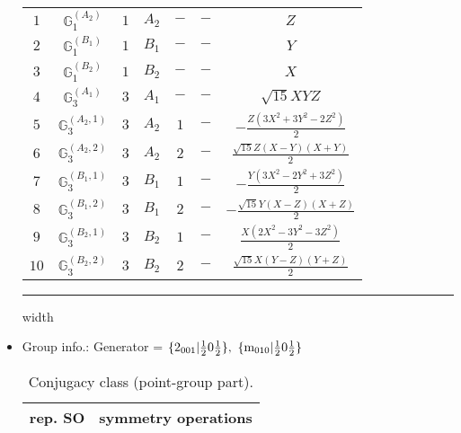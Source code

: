 \documentclass[fleqn,10pt,landscape]{article}
\begin{document}
\begin{itemize}
\begin{center}
\begin{longtable}{ccccccc}
$ 1 $ & $ \mathbb{G}_{1}^{(A_{2})} $ & $ 1 $ & $ A_{2} $ & $ - $ & $ - $ & $ Z $ \\
$ 2 $ & $ \mathbb{G}_{1}^{(B_{1})} $ & $ 1 $ & $ B_{1} $ & $ - $ & $ - $ & $ Y $ \\
$ 3 $ & $ \mathbb{G}_{1}^{(B_{2})} $ & $ 1 $ & $ B_{2} $ & $ - $ & $ - $ & $ X $ \\ \hline
$ 4 $ & $ \mathbb{G}_{3}^{(A_{1})} $ & $ 3 $ & $ A_{1} $ & $ - $ & $ - $ & $ \sqrt{15} X Y Z $ \\
$ 5 $ & $ \mathbb{G}_{3}^{(A_{2},1)} $ & $ 3 $ & $ A_{2} $ & $ 1 $ & $ - $ & $ - \frac{Z \left(3 X^{2} + 3 Y^{2} - 2 Z^{2}\right)}{2} $ \\
$ 6 $ & $ \mathbb{G}_{3}^{(A_{2},2)} $ & $ 3 $ & $ A_{2} $ & $ 2 $ & $ - $ & $ \frac{\sqrt{15} Z \left(X - Y\right) \left(X + Y\right)}{2} $ \\
$ 7 $ & $ \mathbb{G}_{3}^{(B_{1},1)} $ & $ 3 $ & $ B_{1} $ & $ 1 $ & $ - $ & $ - \frac{Y \left(3 X^{2} - 2 Y^{2} + 3 Z^{2}\right)}{2} $ \\
$ 8 $ & $ \mathbb{G}_{3}^{(B_{1},2)} $ & $ 3 $ & $ B_{1} $ & $ 2 $ & $ - $ & $ - \frac{\sqrt{15} Y \left(X - Z\right) \left(X + Z\right)}{2} $ \\
$ 9 $ & $ \mathbb{G}_{3}^{(B_{2},1)} $ & $ 3 $ & $ B_{2} $ & $ 1 $ & $ - $ & $ \frac{X \left(2 X^{2} - 3 Y^{2} - 3 Z^{2}\right)}{2} $ \\
$ 10 $ & $ \mathbb{G}_{3}^{(B_{2},2)} $ & $ 3 $ & $ B_{2} $ & $ 2 $ & $ - $ & $ \frac{\sqrt{15} X \left(Y - Z\right) \left(Y + Z\right)}{2} $ \\
\end{longtable}
\end{center}

 \hfil \hrule height 1mm width \textwidth \hfil

\item Group info.: Generator = $\{2{}_{001}|\frac{1}{2} 0 \frac{1}{2}\},\,\,\{{\rm m}_{010}|\frac{1}{2} 0 \frac{1}{2}\}$

\begin{center}
\renewcommand{\arraystretch}{1.3}
\begin{longtable}{c|l}
\caption{Conjugacy class (point-group part).}
 \\
 \hline \hline
rep. SO & symmetry operations \\ \hline \endfirsthead


\end{longtable}
\end{center}
\end{itemize}
\end{document}
